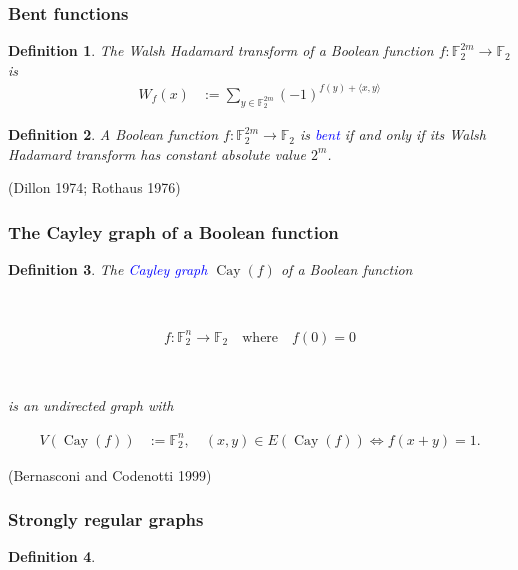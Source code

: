 \documentclass[pdf,sprung,slideColor,nocolorBG]{beamer}
\newenvironment{colortheme}[1]{
\def\ProvidesPackageRCS $##1${\relax}
\renewcommand{\ProcessOptions}{\relax}
\makeatletter

\makeatother
}{}
\newcommand{\slidecite}[1]{\tiny{(#1)}\normalsize{}}
\newcommand{\mb}[1]{\mathbb{#1}}
\newcommand{\Emph}[1]{\emph{\textcolor{blue}{#1}}}
\newcommand{\To}{\rightarrow}
\newcommand{\Cay}[1]{\operatorname{Cay}\left(#1\right)}
\newcommand{\F}{\mb{F}}
\newtheorem{Def}{Definition}
\begin{document}
\begin{colortheme}{seagull}

\begin{frame}
\frametitle{Bent functions}
\begin{Def}
\label{def-Walsh-Hadamard-transform}
The Walsh Hadamard transform of
a Boolean function $f : \F_2^{2m} \To \F_2$ is
\begin{align*}
W_f(x)
&:=
\sum_{y \in \F_2^{2m}} (-1)^{f(y) + \langle x, y \rangle}
\end{align*}
\end{Def}

\begin{Def}
\label{def-Bent-function}
A Boolean function $f : \F_2^{2m} \To \F_2$ is \Emph{bent}
if and only if its Walsh Hada\-mard transform has constant absolute value $2^{m}$.
\end{Def}
\slidecite{Dillon 1974; Rothaus 1976}
\end{frame}

\begin{frame}
\frametitle{The Cayley graph of a Boolean function}
\begin{Def}

The \Emph{Cayley graph} $\Cay{f}$ of a Boolean function

~

\begin{align*}
%
f : \F_2^n \To \F_2 \quad \text{where} \quad f(0) = 0
%
\end{align*}

~

is
an undirected graph with

\begin{align*}
V(\Cay{f}) &:= \F_2^n, \quad (x,y) \in E(\Cay{f}) \Leftrightarrow f(x+y) = 1.
\end{align*}
 
\end{Def}

\slidecite{Bernasconi and Codenotti 1999}
\end{frame}

\begin{frame}
\frametitle{Strongly regular graphs}
\begin{Def}


\end{Def}
\end{frame}
\end{colortheme}
\end{document}
